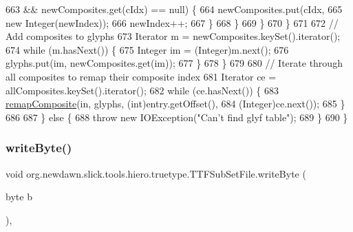 \begin{DoxyCode}
663                                     && newComposites.get(cIdx) == null) \{
664                                 newComposites.put(cIdx,
665                                                   \textcolor{keyword}{new} Integer(newIndex));
666                                 newIndex++;
667                             \}
668                         \}
669                     \}
670                 \}
671 
672                 \textcolor{comment}{// Add composites to glyphs}
673                 Iterator m = newComposites.keySet().iterator();
674                 \textcolor{keywordflow}{while} (m.hasNext()) \{
675                     Integer im = (Integer)m.next();
676                     glyphs.put(im, newComposites.get(im));
677                 \}
678             \}
679 
680             \textcolor{comment}{// Iterate through all composites to remap their composite index}
681             Iterator ce = allComposites.keySet().iterator();
682             \textcolor{keywordflow}{while} (ce.hasNext()) \{
683                 \mbox{\hyperlink{classorg_1_1newdawn_1_1slick_1_1tools_1_1hiero_1_1truetype_1_1_t_t_f_sub_set_file_a1c99664772adc2dea1919d7bc183a352}{remapComposite}}(in, glyphs, (\textcolor{keywordtype}{int})entry.getOffset(),
684                                (Integer)ce.next());
685             \}
686 
687         \} \textcolor{keywordflow}{else} \{
688             \textcolor{keywordflow}{throw} \textcolor{keyword}{new} IOException(\textcolor{stringliteral}{"Can't find glyf table"});
689         \}
690     \}
\end{DoxyCode}
\mbox{\label{classorg_1_1newdawn_1_1slick_1_1tools_1_1hiero_1_1truetype_1_1_t_t_f_sub_set_file_ab27330bb1da2d8ac68f9daa3419139d4}} 
\subsubsection{\texorpdfstring{write\+Byte()}{writeByte()}}
{\footnotesize\ttfamily void org.\+newdawn.\+slick.\+tools.\+hiero.\+truetype.\+T\+T\+F\+Sub\+Set\+File.\+write\+Byte (\begin{DoxyParamCaption}\item[{byte}]{b }\end{DoxyParamCaption})\hspace{0.3cm}{\ttfamily [inline]}, {\ttfamily [private]}}

